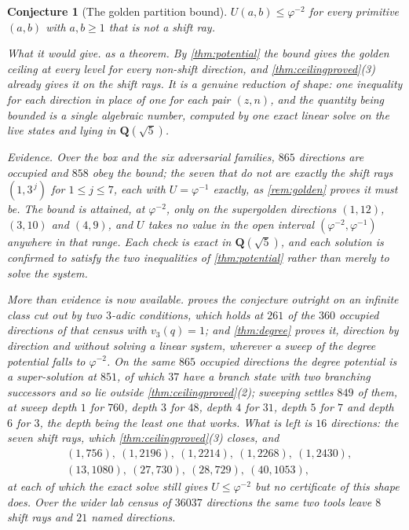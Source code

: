 \documentclass[11pt]{amsart}
\newtheorem{conjecture}[theorem]{Conjecture}
\theoremstyle{definition}
\theoremstyle{remark}
\begin{document}
\begin{conjecture}[The golden partition bound]
\label{con:potential}
$U(a,b)\le\varphi^{-2}$ for every primitive $(a,b)$ with $a,b\ge 1$ that is not a shift ray.
\smallskip

\noindent\emph{What it would give.}  as a theorem. By \cref{thm:potential} the bound gives the golden ceiling at every level for every non-shift direction, and \cref{thm:ceilingproved}(3) already gives it on the shift rays. It is a genuine reduction of shape: one inequality for each direction in place of one for each pair $(z,n)$, and the quantity being bounded is a single algebraic number, computed by one exact linear solve on the live states and lying in $\mathbf{Q}(\sqrt5)$.
\smallskip

\noindent\emph{Evidence.} Over the box and the six adversarial families, $865$ directions are occupied and $858$ obey the bound; the seven that do not are exactly the shift rays $(1,3^{\,j})$ for $1\le j\le 7$, each with $U=\varphi^{-1}$ exactly, as \cref{rem:golden} proves it must be. The bound is attained, at $\varphi^{-2}$, only on the supergolden directions $(1,12)$, $(3,10)$ and $(4,9)$, and $U$ takes no value in the open interval $(\varphi^{-2},\varphi^{-1})$ anywhere in that range. Each check is exact in $\mathbf{Q}(\sqrt5)$, and each solution is confirmed to satisfy the two inequalities of \cref{thm:potential} rather than merely to solve the system.

More than evidence is now available.  proves the conjecture outright on an infinite class cut out by two $3$-adic conditions, which holds at $261$ of the $360$ occupied directions of that census with $v_3(q)=1$; and \cref{thm:degree} proves it, direction by direction and without solving a linear system, wherever a sweep of the degree potential falls to $\varphi^{-2}$. On the same $865$ occupied directions the degree potential is a super-solution at $851$, of which $37$ have a branch state with two branching successors and so lie outside \cref{thm:ceilingproved}(2); sweeping settles $849$ of them, at sweep depth $1$ for $760$, depth $3$ for $48$, depth $4$ for $31$, depth $5$ for $7$ and depth $6$ for $3$, the depth being the least one that works. What is left is $16$ directions: the seven shift rays, which \cref{thm:ceilingproved}(3) closes, and
\[
\begin{aligned}
&(1,756),\ (1,2196),\ (1,2214),\ (1,2268),\ (1,2430),\\
&(13,1080),\ (27,730),\ (28,729),\ (40,1053),
\end{aligned}
\]
at each of which the exact solve still gives $U\le\varphi^{-2}$ but no certificate of this shape does. Over the wider lab census of $36037$ directions the same two tools leave $8$ shift rays and $21$ named directions.
\smallskip


\end{conjecture}
\end{document}
